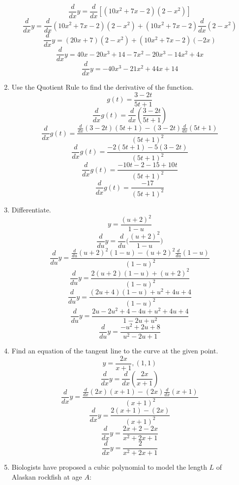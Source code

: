 \documentclass[12pt]{article}
\begin{document}
\begin{enumerate}
            \[{\displaystyle \frac{d}{dx} y = \frac{d}{dx}[(10x^2 + 7x -2)(2-x^2)]}\]
            \[{\displaystyle \frac{d}{dx} y = \frac{d}{dx}(10x^2 + 7x -2)(2-x^2) + (10x^2 + 7x - 2)\frac{d}{dx}(2-x^2)}\]
            \[{\displaystyle \frac{d}{dx} y = (20x + 7)(2-x^2) + (10x^2 + 7x - 2)(-2x)}\]
            \[{\displaystyle \frac{d}{dx} y = 40x - 20x^3 + 14 - 7x^2 -20x^3 - 14x^2 + 4x}\]
            \[\boxed{\displaystyle \frac{d}{dx} y = -40x^3 -21x^2 + 44x + 14}\]
            \setcounter{enumi}{34}
      \item Use the Quotient Rule to find the derivative of the function.
            \[{\displaystyle g(t) = \frac{3-2t}{5t+1}}\]
            \[{\displaystyle \frac{d}{dx} g(t) = \frac{d}{dx}(\frac{3-2t}{5t+1})}\]
            \[{\displaystyle \frac{d}{dx} g(t) = \frac{\frac{d}{dx}(3-2t)(5t+1) - (3-2t)\frac{d}{dx}(5t+1)}{(5t+1)^2}}\]
            \[{\displaystyle \frac{d}{dx} g(t) = \frac{-2(5t+1) - 5(3-2t)}{(5t+1)^2}}\]
            \[{\displaystyle \frac{d}{dx} g(t) = \frac{-10t - 2 - 15 + 10t}{(5t+1)^2}}\]
            \[\boxed{\displaystyle \frac{d}{dx} g(t) = \frac{- 17}{(5t+1)^2}}\]
            \setcounter{enumi}{41}
            \newpage
      \item Differentiate.
            \[{\displaystyle y = \frac{(u+2)^2}{1-u}}\]
            \[{\displaystyle \frac{d}{du} y = \frac{d}{du}(\frac{(u+2)^2}{1-u}})\]
            \[{\displaystyle \frac{d}{du} y = \frac{\frac{d}{du}(u+2)^2(1-u) - (u+2)^2\frac{d}{du}(1-u)}{(1-u)^2}}\]
            \[{\displaystyle \frac{d}{du} y = \frac{2(u+2)(1-u) + (u+2)^2}{(1-u)^2}}\]
            \[{\displaystyle \frac{d}{du} y = \frac{(2u+4)(1-u) + u^2 + 4u + 4}{(1-u)^2}}\]
            \[{\displaystyle \frac{d}{du} y = \frac{2u-2u^2+4-4u + u^2 + 4u + 4}{1-2u+u^2}}\]
            \[\boxed{\displaystyle \frac{d}{du} y = \frac{-u^2 + 2u + 8}{u^2 - 2u + 1}}\]
            \setcounter{enumi}{58}
      \item Find an equation of the tangent line to the curve at the given point.
            \[{\displaystyle y = \frac{2x}{x + 1}}, (1,1)\]
            \[{\displaystyle \frac{d}{dx}y = \frac{d}{dx} (\frac{2x}{x + 1})}\]
            \[{\displaystyle \frac{d}{dx}y = \frac{\frac{d}{dx}(2x)(x+1) - (2x)\frac{d}{dx}(x+1)}{(x + 1)^2}}\]
            \[{\displaystyle \frac{d}{dx}y = \frac{2(x+1) - (2x)}{(x + 1)^2}}\]
            \[{\displaystyle \frac{d}{dx}y = \frac{2x+ 2 - 2x}{x^2 + 2x + 1}}\]
            \[\boxed{\displaystyle \frac{d}{dx}y = \frac{2}{x^2 + 2x + 1}}\]
            \setcounter{enumi}{74}
      \item Biologists have proposed a cubic polynomial to model the length $L$ of Alaskan rockfish at age $A$:

\end{enumerate}
\end{document}
